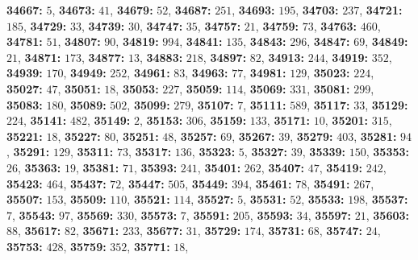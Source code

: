 \textsf{\bfseries 34667:} $5$, \textsf{\bfseries 34673:} $41$, \textsf{\bfseries 34679:} $52$, \textsf{\bfseries 34687:} $251$, \textsf{\bfseries 34693:} $195$, \textsf{\bfseries 34703:} $237$, \textsf{\bfseries 34721:} $185$, \textsf{\bfseries 34729:} $33$, \textsf{\bfseries 34739:} $30$, \textsf{\bfseries 34747:} $35$, \textsf{\bfseries 34757:} $21$, \textsf{\bfseries 34759:} $73$, \textsf{\bfseries 34763:} $460$, \textsf{\bfseries 34781:} $51$, \textsf{\bfseries 34807:} $90$, \textsf{\bfseries 34819:} $994$, \textsf{\bfseries 34841:} $135$, \textsf{\bfseries 34843:} $296$, \textsf{\bfseries 34847:} $69$, \textsf{\bfseries 34849:} $21$, \textsf{\bfseries 34871:} $173$, \textsf{\bfseries 34877:} $13$, \textsf{\bfseries 34883:} $218$, \textsf{\bfseries 34897:} $82$, \textsf{\bfseries 34913:} $244$, \textsf{\bfseries 34919:} $352$, \textsf{\bfseries 34939:} $170$, \textsf{\bfseries 34949:} $252$, \textsf{\bfseries 34961:} $83$, \textsf{\bfseries 34963:} $77$, \textsf{\bfseries 34981:} $129$, \textsf{\bfseries 35023:} $224$, \textsf{\bfseries 35027:} $47$, \textsf{\bfseries 35051:} $18$, \textsf{\bfseries 35053:} $227$, \textsf{\bfseries 35059:} $114$, \textsf{\bfseries 35069:} $331$, \textsf{\bfseries 35081:} $299$, \textsf{\bfseries 35083:} $180$, \textsf{\bfseries 35089:} $502$, \textsf{\bfseries 35099:} $279$, \textsf{\bfseries 35107:} $7$, \textsf{\bfseries 35111:} $589$, \textsf{\bfseries 35117:} $33$, \textsf{\bfseries 35129:} $224$, \textsf{\bfseries 35141:} $482$, \textsf{\bfseries 35149:} $2$, \textsf{\bfseries 35153:} $306$, \textsf{\bfseries 35159:} $133$, \textsf{\bfseries 35171:} $10$, \textsf{\bfseries 35201:} $315$, \textsf{\bfseries 35221:} $18$, \textsf{\bfseries 35227:} $80$, \textsf{\bfseries 35251:} $48$, \textsf{\bfseries 35257:} $69$, \textsf{\bfseries 35267:} $39$, \textsf{\bfseries 35279:} $403$, \textsf{\bfseries 35281:} $94$, \textsf{\bfseries 35291:} $129$, \textsf{\bfseries 35311:} $73$, \textsf{\bfseries 35317:} $136$, \textsf{\bfseries 35323:} $5$, \textsf{\bfseries 35327:} $39$, \textsf{\bfseries 35339:} $150$, \textsf{\bfseries 35353:} $26$, \textsf{\bfseries 35363:} $19$, \textsf{\bfseries 35381:} $71$, \textsf{\bfseries 35393:} $241$, \textsf{\bfseries 35401:} $262$, \textsf{\bfseries 35407:} $47$, \textsf{\bfseries 35419:} $242$, \textsf{\bfseries 35423:} $464$, \textsf{\bfseries 35437:} $72$, \textsf{\bfseries 35447:} $505$, \textsf{\bfseries 35449:} $394$, \textsf{\bfseries 35461:} $78$, \textsf{\bfseries 35491:} $267$, \textsf{\bfseries 35507:} $153$, \textsf{\bfseries 35509:} $110$, \textsf{\bfseries 35521:} $114$, \textsf{\bfseries 35527:} $5$, \textsf{\bfseries 35531:} $52$, \textsf{\bfseries 35533:} $198$, \textsf{\bfseries 35537:} $7$, \textsf{\bfseries 35543:} $97$, \textsf{\bfseries 35569:} $330$, \textsf{\bfseries 35573:} $7$, \textsf{\bfseries 35591:} $205$, \textsf{\bfseries 35593:} $34$, \textsf{\bfseries 35597:} $21$, \textsf{\bfseries 35603:} $88$, \textsf{\bfseries 35617:} $82$, \textsf{\bfseries 35671:} $233$, \textsf{\bfseries 35677:} $31$, \textsf{\bfseries 35729:} $174$, \textsf{\bfseries 35731:} $68$, \textsf{\bfseries 35747:} $24$, \textsf{\bfseries 35753:} $428$, \textsf{\bfseries 35759:} $352$, \textsf{\bfseries 35771:} $18$, 
